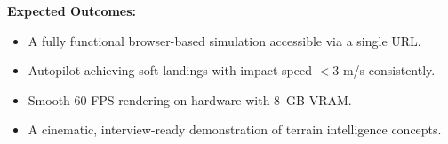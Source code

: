 \textbf{Expected Outcomes:}
\begin{itemize}
    \item A fully functional browser-based simulation accessible via a single URL.
    \item Autopilot achieving soft landings with impact speed $< 3$ m/s consistently.
    \item Smooth 60 FPS rendering on hardware with 8~GB VRAM.
    \item A cinematic, interview-ready demonstration of terrain intelligence concepts.
\end{itemize}
